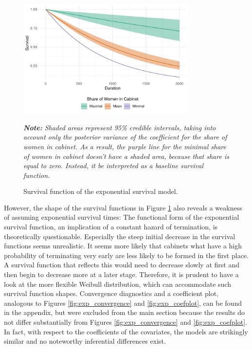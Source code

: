 \documentclass[11pt]{article}
\newcommand\fnote[1]{\captionsetup{font=footnotesize}\caption*{\textit{#1}}}
\newcommand\minp[1]{\begin{minipage}{0.8\textwidth} #1 \end{minipage}}
\begin{document}
\begin{figure}[!ht]
    \centering
    \minp{\caption{Survival function of the exponential survival model.} \label{fig:exp_survplot}}
    \includegraphics[width = 0.8\textwidth]{figures/fig4_exp_survplot.pdf}
    \minp{\fnote{\textbf{Note:} Shaded areas represent 95\% credible intervals, taking into account only the posterior variance of the coefficient for the share of women in cabinet. As a result, the purple line for the minimal share of women in cabinet doesn't have a shaded area, because that share is equal to zero. Instead, it be interpreted as a baseline survival function.}}
\end{figure}

However, the shape of the survival functions in Figure \ref{fig:exp_survplot} also reveals a weakness of assuming exponential survival times: The functional form of the exponential survival function, an implication of a constant hazard of termination, is theoretically questionable. Especially the steep initial decrease in the survival functions seems unrealistic. It seems more likely that cabinets what have a high probability of terminating very early are less likely to be formed in the first place. A survival function that reflects this would need to decrease slowly at first and then begin to decrease more at a later stage. Therefore, it is prudent to have a look at the more flexible Weibull distribution, which can accommodate such survival function shapes. Convergence diagnostics and a coefficient plot, analogous to Figures \ref{fig:exp_convergence} and \ref{fig:exp_coefplot}, can be found in the appendix, but were excluded from the main section because the results do not differ substantially from Figures \ref{fig:exp_convergence} and \ref{fig:exp_coefplot}. In fact, with respect to the coefficients of the covariates, the models are strikingly similar and no noteworthy inferential differences exist.
\end{document}
